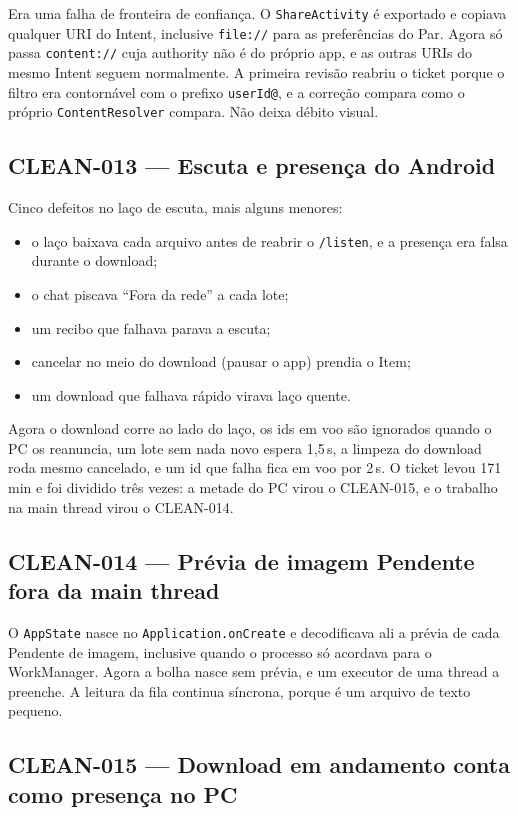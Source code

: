 \documentclass[11pt,a4paper]{article}
\begin{document}
Era uma falha de fronteira de confiança. O \texttt{ShareActivity} é exportado
e copiava qualquer URI do Intent, inclusive \texttt{file://} para as
preferências do Par. Agora só passa \texttt{content://} cuja authority não é do
próprio app, e as outras URIs do mesmo Intent seguem normalmente. A primeira
revisão reabriu o ticket porque o filtro era contornável com o prefixo
\texttt{userId@}, e a correção compara como o próprio \texttt{ContentResolver}
compara. Não deixa débito visual.

\subsection*{CLEAN-013 --- Escuta e presença do Android}

Cinco defeitos no laço de escuta, mais alguns menores:
\begin{itemize}
  \item o laço baixava cada arquivo antes de reabrir o \texttt{/listen}, e a
        presença era falsa durante o download;
  \item o chat piscava ``Fora da rede'' a cada lote;
  \item um recibo que falhava parava a escuta;
  \item cancelar no meio do download (pausar o app) prendia o Item;
  \item um download que falhava rápido virava laço quente.
\end{itemize}
Agora o download corre ao lado do laço, os ids em voo são ignorados quando o
PC os reanuncia, um lote sem nada novo espera 1,5\,s, a limpeza do download
roda mesmo cancelado, e um id que falha fica em voo por 2\,s. O ticket levou 171 min e foi
dividido três vezes: a metade do PC virou o CLEAN-015, e o trabalho na main
thread virou o CLEAN-014.

\subsection*{CLEAN-014 --- Prévia de imagem Pendente fora da main thread}

O \texttt{AppState} nasce no \texttt{Application.onCreate} e decodificava ali
a prévia de cada Pendente de imagem, inclusive quando o processo só acordava
para o WorkManager. Agora a bolha nasce sem prévia, e um executor de uma
thread a preenche. A leitura da fila continua síncrona, porque é um arquivo de
texto pequeno.

\subsection*{CLEAN-015 --- Download em andamento conta como presença no PC}
\end{document}
